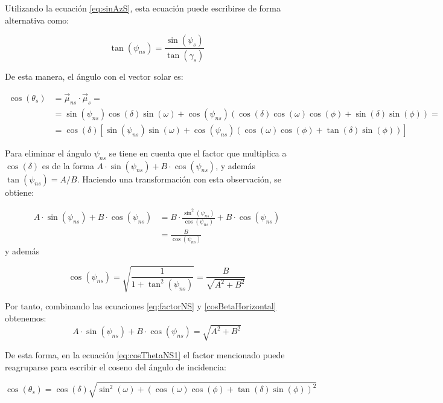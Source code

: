 Utilizando la ecuación \eqref{eq:sinAzS}, esta ecuación puede escribirse
de forma alternativa como:

\begin{equation}
\tan(\psi_{ns})=\frac{\sin(\psi_{s})}{\tan(\gamma_{s})}\label{eq:tanPsiNS2}\end{equation}


De esta manera, el ángulo con el vector solar es:

\begin{align}
\cos(\theta_{s}) & =\vec{\mu}_{ns}\cdot\vec{\mu}_{s}=\nonumber \\
 & =\sin(\psi_{ns})\cos\left(\delta\right)\sin\left(\omega\right)+\cos(\psi_{ns})\left(\cos(\delta)\cos(\omega)\cos(\phi)+\sin(\delta)\sin(\phi)\right)=\nonumber \\
 & =\cos(\delta)\left[\sin(\psi_{ns})\sin(\omega)+\cos(\psi_{ns})\left(\cos(\omega)\cos(\phi)+\tan(\delta)\sin(\phi)\right)\right]\label{eq:cosThetaNS1}\end{align}


Para eliminar el ángulo $\psi_{ns}$ se tiene en cuenta que el factor
que multiplica a $\cos(\delta)$ es de la forma $A\cdot\sin(\psi_{ns})+B\cdot\cos(\psi_{ns})$,
y además $\tan(\psi_{ns})=A/B$. Haciendo una transformación con esta
observación, se obtiene:

\begin{align}
A\cdot\sin(\psi_{ns})+B\cdot\cos(\psi_{ns}) & =B\cdot\frac{\sin^{2}(\psi_{ns})}{\cos(\psi_{ns})}+B\cdot\cos(\psi_{ns})\nonumber \\
 & =\frac{B}{\cos(\psi_{ns})}
\label{eq:factorNS}\end{align}
y además

\begin{equation}
\cos(\psi_{ns}) =\sqrt{\frac{1}{1+\tan^{2}(\psi_{ns})}} =
\frac{B}{\sqrt{A^{2}+B^{2}}}
\label{cosBetaHorizontal}
\end{equation}


Por tanto, combinando las ecuaciones \eqref{eq:factorNS} y
\eqref{cosBetaHorizontal} obtenemos: 
\begin{equation}
A\cdot\sin(\psi_{ns})+B\cdot\cos(\psi_{ns})=\sqrt{A^{2}+B^{2}}\label{reagrupa_tan}\end{equation}

De esta forma, en la ecuación \eqref{eq:cosThetaNS1} el factor
mencionado puede reagruparse para escribir el coseno del ángulo de
incidencia:

\begin{equation}
\cos(\theta_{s})=\cos(\delta)\sqrt{\sin^{2}(\omega)+\left(\cos(\omega)\cos(\phi)+\tan(\delta)\sin(\phi)\right)^{2}}\label{eq:cosThetaNS_Final}\end{equation}


